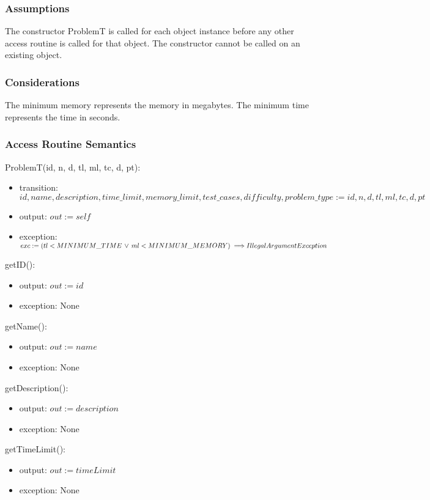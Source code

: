 \documentclass[12pt, titlepage]{article}
\begin{document}
\subsubsection{Assumptions}
The constructor ProblemT is called for each object instance before any other access routine is called for that object. The constructor cannot be called on an existing object.

\subsubsection{Considerations}
The minimum memory represents the memory in megabytes. The minimum time represents the time in seconds.

\subsubsection{Access Routine Semantics}

\noindent ProblemT(id, n, d, tl, ml, tc, d, pt):
\begin{itemize}
\item transition: $id, name, description, time\_limit, memory\_limit, test\_cases, difficulty, problem\_type := id, n, d, tl, ml, tc, d, pt$
\item output: $out := self$
\item exception: $exc := (tl < MINIMUM\_TIME \, \lor \, ml < MINIMUM\_MEMORY) \implies \\IllegalArgumentException$
\end{itemize}

\noindent getID():
\begin{itemize}
\item output: $out := id$
\item exception: None
\end{itemize}

\noindent getName():
\begin{itemize}
\item output: $out := name$
\item exception: None
\end{itemize}

\noindent getDescription():
\begin{itemize}
\item output: $out := description$
\item exception: None
\end{itemize}

\noindent getTimeLimit():
\begin{itemize}
\item output: $out := timeLimit$
\item exception: None
\end{itemize}
\end{document}

